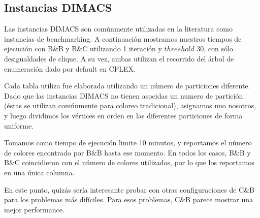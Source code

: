 \subsection{Instancias DIMACS}

Las instancias DIMACS son comúnmente utilizadas en la literatura como instancias de benchmarking. A continuación mostramos nuestros tiempos de ejecución con B\&B y B\&C utilizando 1 iteración y $threshold$ 30, con sólo desigualdades de clique. A su vez, ambas utilizan el recorrido del árbol de enumeración dado por default en CPLEX.

Cada tabla utiliza fue elaborada utilizando un número de particiones diferente. Dado que las instancias DIMACS no tienen asocidas un numero de partición (éstas se utilizan comúnmente para coloreo tradicional), asignamos uno nosotros, y luego dividimos los vértices en orden en las diferentes particiones de forma uniforme.

Tomamos como tiempo de ejecución limite 10 minutos, y reportamos el número de colores encontrado por B\&B hasta ese momento. En todos los casos, B\&B y B\&C coincidieron con el número de colores utilizados, por lo que los reportamos en una única columna.

En este punto, quizás sería interesante probar con otras configuraciones de C\&B para los problemas más difíciles. Para esos problemas, C\&B parece mostrar una mejor performance.

